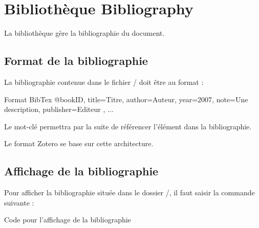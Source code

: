 \chapter{Bibliothèque Bibliography}
\label{biblio}

La bibliothèque  gère la bibliographie du document.

\section{Format de la bibliographie}

La bibliographie contenue dans le fichier / doit être au format  : \\

\begin{Bash}{Format BibTex}
    @book{ID,
    title={Titre},
    author={Auteur},
    year={2007},
    note={Une description},
    publisher={Editeur}
},
 ...
\end{Bash}

Le mot-clé  permettra par la suite de référencer l'élément dans la bibliographie.


Le format Zotero se base sur cette architecture.

\section{Affichage de la bibliographie}

Pour afficher la bibliographie située dans le dossier /, il faut saisir la commande suivante : \\

\begin{Latex}{Code pour l'affichage de la bibliographie}
\end{Latex}





